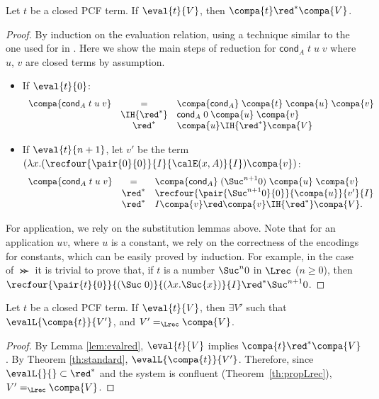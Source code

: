 \documentclass{article}
\begin{document}
\begin{lemma}\label{lem:evalred}Let $t$ be a closed PCF term. If $\eval{t}{V}$, then $\compa{t}\red^*\compa{V}$.
\end{lemma}
\begin{proof}
By induction on the evaluation relation, using a technique
similar to the one used for \ST in \cite{AlvesS:TCS}.
Here we show the
main steps of reduction for $\mathsf{cond}_{A}\;t\;u\;v$ where $u$, $v$
are closed terms by assumption.
\begin{itemize}
\item If $\eval{t}{0}$: \\
\[
\begin{array}{lcl}
\compa{\mathsf{cond}_{A}\;t\;u\;v} & = &
\compa{\mathsf{cond}_{A}}\; \compa{t}\; \compa{u}\;\compa{v} \\
&\IH{\red^*}&\mathsf{cond}_{A}\; 0\; \compa{u}\;\compa{v} \\&\red^*& \compa{u} \IH{\red^*} \compa {V}
\end{array}
\]
\item If $\eval{t}{n+1}$, let $v'$ be the term ${(\lambda
x.(\recfour{\pair{0}{0}}{I}{\calE(x,A)}{I})\compa{v})}$:\\
\[
\begin{array}{lcl}
\compa{\mathsf{cond}_{A}\;t\;u\;v} &=& \compa{\mathsf{cond}_{A}}\;
(\Suc^{n+1}0)\; \compa{u}\;\compa{v}
\\
&\red^* & \recfour{\pair{\Suc^{n+1}0}{0}}{\compa{u}}{v'}{I}\\
&\red^* & I \compa{v} \red \compa{v}  \IH{\red^*} \compa {V}.\\
\end{array}
\]
\end{itemize}
For application, we rely on the substitution lemmas above.
Note that for an application $uv$, where $u$ is a constant, we rely on the correctness of the encodings for constants, which can be easily proved by induction. For example, in the case of $\Succ$ it is trivial to prove that, if $t$ is a number
$\Suc^n{0}$ in $\Lrec$ ($n \ge 0$), then $\recfour{\pair{t}{0}}{(\Suc
\;0)}{(\lambda x.\Suc{x})}{I} \red^* \Suc^{n+1}{0}$.
\end{proof}

\begin{theorem} Let $t$ be a closed PCF term. If $\eval{t}{V}$, then $\exists V'$ such that $\evalL{\compa{t}}{V'}$, and $V' =_{\Lrec}
\compa{V}$.
\end{theorem}
\begin{proof}
By Lemma \ref{lem:evalred}, $\eval{t}{V}$ implies $\compa{t}\red^* \compa{V}$. 
By Theorem \ref{th:standard}, $\evalL{\compa{t}}{V'}$. Therefore, since
$\evalL{}{} \subset \red^*$ and  the system is confluent (Theorem~\ref{th:propLrec}), 
$V'=_{\Lrec}  \compa{V}$. 
\end{proof}
\end{document}
